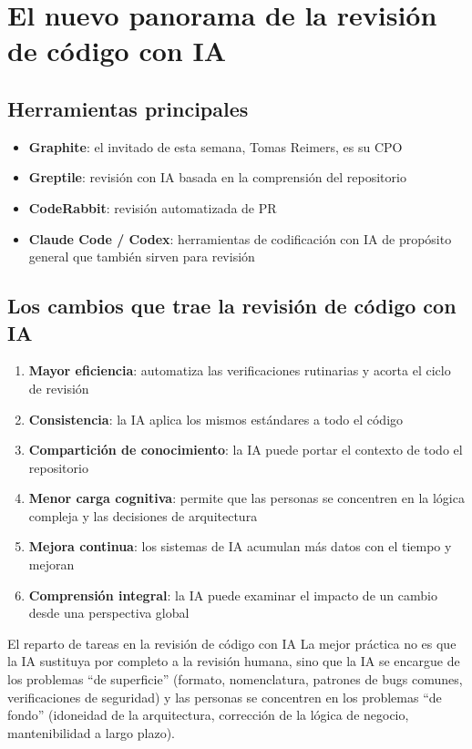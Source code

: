\section{El nuevo panorama de la revisión de código con IA}

\subsection{Herramientas principales}

\begin{itemize}
    \item \textbf{Graphite}: el invitado de esta semana, Tomas Reimers, es su CPO
    \item \textbf{Greptile}: revisión con IA basada en la comprensión del repositorio
    \item \textbf{CodeRabbit}: revisión automatizada de PR
    \item \textbf{Claude Code / Codex}: herramientas de codificación con IA de propósito general que también sirven para revisión
\end{itemize}

\subsection{Los cambios que trae la revisión de código con IA}

\begin{enumerate}
    \item \textbf{Mayor eficiencia}: automatiza las verificaciones rutinarias y acorta el ciclo de revisión
    \item \textbf{Consistencia}: la IA aplica los mismos estándares a todo el código
    \item \textbf{Compartición de conocimiento}: la IA puede portar el contexto de todo el repositorio
    \item \textbf{Menor carga cognitiva}: permite que las personas se concentren en la lógica compleja y las decisiones de arquitectura
    \item \textbf{Mejora continua}: los sistemas de IA acumulan más datos con el tiempo y mejoran
    \item \textbf{Comprensión integral}: la IA puede examinar el impacto de un cambio desde una perspectiva global
\end{enumerate}

\begin{knowledgebox}{El reparto de tareas en la revisión de código con IA}
La mejor práctica no es que la IA sustituya por completo a la revisión humana, sino que la IA se encargue de los problemas ``de superficie'' (formato, nomenclatura, patrones de bugs comunes, verificaciones de seguridad) y las personas se concentren en los problemas ``de fondo'' (idoneidad de la arquitectura, corrección de la lógica de negocio, mantenibilidad a largo plazo).
\end{knowledgebox}

